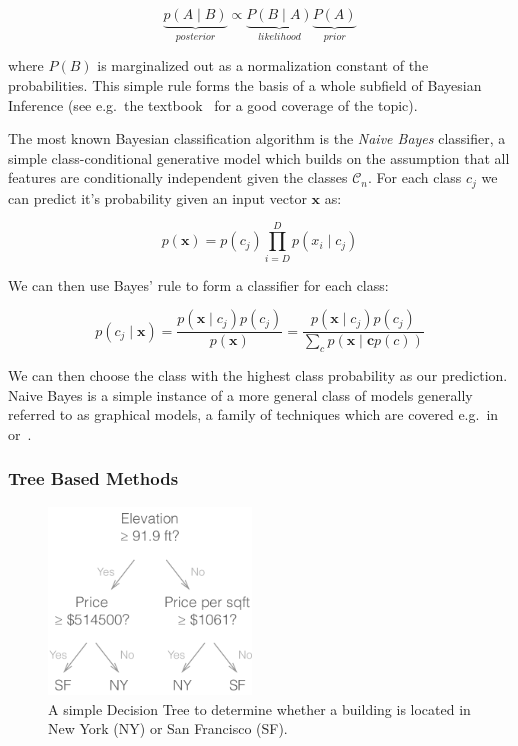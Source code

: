 \begin{equation}
  \underbrace{p(A \mid B)}_{posterior}  \propto \underbrace{P(B \mid A)}_{likelihood} \underbrace{P(A)}_{prior}
\end{equation}

where $P(B)$ is marginalized out as a normalization constant of the probabilities. This simple rule forms the basis of a whole subfield of Bayesian Inference (see e.g.\ the textbook~\cite{Barber:2012aa} for a good coverage of the topic).

The most known Bayesian classification algorithm is the \emph{Naive Bayes} classifier, a simple class-conditional generative model which builds on the assumption that all features are conditionally independent given the classes $\mathcal{C}_n$. For each class $c_j$ we can predict it's probability given an input vector $\mathbf{x}$ as:

\begin{equation}
  p(\mathbf{x}) = p(c_j) \prod_{i=D}^D p(x_i \mid c_j)
\end{equation}

We can then use Bayes' rule to form a classifier for each class:

\begin{equation}
  p(c_j \mid \mathbf{x}) = \frac{p(\mathbf{x} \mid c_j ) p(c_j)}{ p (\mathbf{x})} = \frac{p(\mathbf{x} \mid c_j ) p(c_j)}{ \sum_c p(\mathbf{x \mid c} p(c)) }
\end{equation}

We can then choose the class with the highest class probability as our prediction. Naive Bayes is a simple instance of a more general class of models generally referred to as graphical models, a family of techniques which are covered e.g.\ in~\cite{Barber:2012aa} or~\cite{Bishop:2006aa}.

\subsubsection{Tree Based Methods}
\label{subs:Tree Based Methods}

\begin{figure}
  \centering
  \includegraphics[width=0.48\textwidth]{img/decision-tree.pdf}
  \caption{A simple Decision Tree to determine whether a building is located in New York (NY) or San Francisco (SF).}
\label{fig:decision-tree}
\end{figure}

